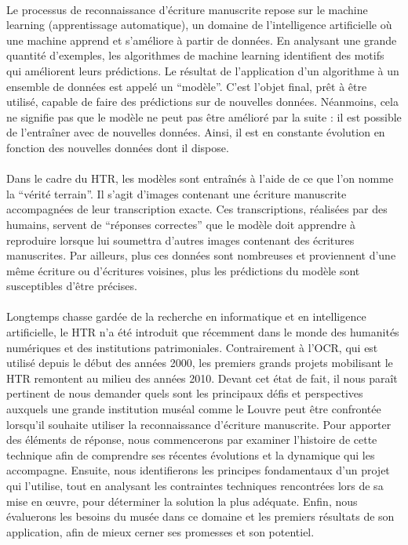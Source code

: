 \documentclass[a4paper,12pt,twoside]{book}
\begin{document}
\paragraph{}
Le processus de reconnaissance d’écriture manuscrite repose sur le machine learning (apprentissage automatique), un domaine de l’intelligence artificielle où une machine apprend et s’améliore à partir de données. En analysant une grande quantité d’exemples, les algorithmes de machine learning identifient des motifs qui améliorent leurs prédictions. Le résultat de l’application d’un algorithme à un ensemble de données est appelé un “modèle”. C’est l’objet final, prêt à être utilisé, capable de faire des prédictions sur de nouvelles données. Néanmoins, cela ne signifie pas que le modèle ne peut pas être amélioré par la suite : il est possible de l'entraîner avec de nouvelles données. Ainsi, il est en constante évolution en fonction des nouvelles données dont il dispose.

\paragraph{}
Dans le cadre du HTR, les modèles sont entraînés à l’aide de ce que l’on nomme la \enquote{vérité terrain}. Il s’agit d’images contenant une écriture manuscrite accompagnées de leur transcription exacte. Ces transcriptions, réalisées par des humains, servent de \enquote{réponses correctes} que le modèle doit apprendre à reproduire lorsque lui soumettra d’autres images contenant des écritures manuscrites. Par ailleurs, plus ces données sont nombreuses et proviennent d'une même écriture ou d'écritures voisines, plus les prédictions du modèle sont susceptibles d'être précises.

\paragraph{}
Longtemps chasse gardée de la recherche en informatique et en intelligence artificielle, le HTR n’a été introduit que récemment dans le monde des humanités numériques et des institutions patrimoniales. Contrairement à l'OCR, qui est utilisé depuis le début des années 2000, les premiers grands projets mobilisant le HTR remontent au milieu des années 2010. Devant cet état de fait, il nous paraît pertinent de nous demander quels sont les principaux défis et perspectives auxquels une grande institution muséal comme le Louvre peut être confrontée lorsqu'il souhaite utiliser la reconnaissance d’écriture manuscrite. Pour apporter des éléments de réponse, nous commencerons par examiner l’histoire de cette technique afin de comprendre ses récentes évolutions et la dynamique qui les accompagne. Ensuite, nous identifierons les principes fondamentaux d’un projet qui l’utilise, tout en analysant les contraintes techniques rencontrées lors de sa mise en œuvre, pour déterminer la solution la plus adéquate. Enfin, nous évaluerons les besoins du musée dans ce domaine et les premiers résultats de son application, afin de mieux cerner ses promesses et son potentiel.
\end{document}
